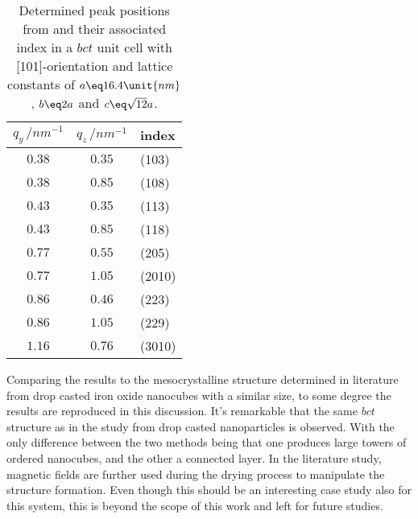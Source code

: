 \documentclass[\main/dresen_thesis.tex]{subfiles}
\begin{document}
  \begin{table}[!htbp]
    \centering
    \caption{\label{tab:colloidalCrystals:gisaxs:peaks}Determined peak positions from  and their associated index in a $bct$ unit cell with [101]-orientation and lattice constants of $a \eq 16.4 \unit{nm}$, $b \eq 2a$ and $c \eq \sqrt{12}a$.}
    \begin{tabular}{ c | c | l }
      $q_y\,/ \unit{nm^{-1}}$ & $q_z\, / \unit{nm^{-1}}$ & index \\
      \hline
      $0.38$      & $0.35$  & (103)\\
      $0.38$      & $0.85$  & (108)\\
      $0.43$      & $0.35$  & (113)\\
      $0.43$      & $0.85$  & (118)\\
      $0.77$      & $0.55$  & (205)\\
      $0.77$      & $1.05$  & (2010)\\
      $0.86$      & $0.46$  & (223)\\
      $0.86$      & $1.05$  & (229)\\
      $1.16$      & $0.76$  & (3010)\\
      \hline
    \end{tabular}
  \end{table}

  Comparing the results to the mesocrystalline structure determined in literature \cite{Wetterskog_2016_Tunin} from drop casted iron oxide nanocubes with a similar size, to some degree the results are reproduced in this discussion.
  It's remarkable that the same $bct$ structure as in the study from drop casted nanoparticles is observed.
  With the only difference between the two methods being that one produces large towers of ordered nanocubes, and the other a connected layer.
  In the literature study, magnetic fields are further used during the drying process to manipulate the structure formation.
  Even though this should be an interesting case study also for this system, this is beyond the scope of this work and left for future studies.
\end{document}
